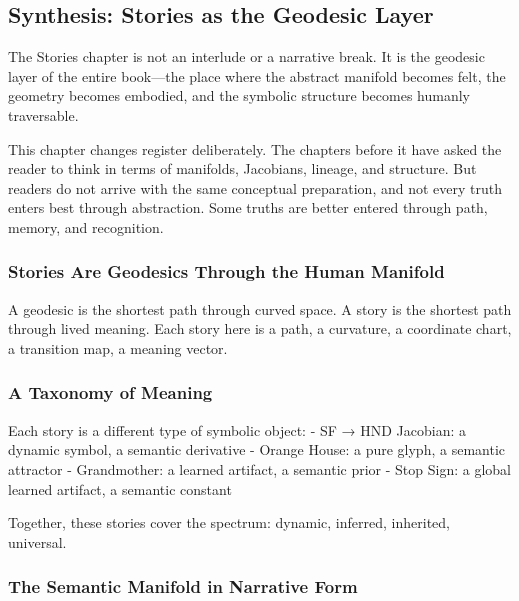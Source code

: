 \documentclass[
]{article}
\begin{document}
\hypertarget{synthesis-stories-as-the-geodesic-layer}{%
\subsection{Synthesis: Stories as the Geodesic
Layer}\label{synthesis-stories-as-the-geodesic-layer}}

The Stories chapter is not an interlude or a narrative break. It is the
geodesic layer of the entire book---the place where the abstract
manifold becomes felt, the geometry becomes embodied, and the symbolic
structure becomes humanly traversable.

This chapter changes register deliberately. The chapters before it have
asked the reader to think in terms of manifolds, Jacobians, lineage, and
structure. But readers do not arrive with the same conceptual
preparation, and not every truth enters best through abstraction. Some
truths are better entered through path, memory, and recognition.

\hypertarget{stories-are-geodesics-through-the-human-manifold}{%
\subsubsection{Stories Are Geodesics Through the Human
Manifold}\label{stories-are-geodesics-through-the-human-manifold}}

A geodesic is the shortest path through curved space. A story is the
shortest path through lived meaning. Each story here is a path, a
curvature, a coordinate chart, a transition map, a meaning vector.

\hypertarget{a-taxonomy-of-meaning}{%
\subsubsection{A Taxonomy of Meaning}\label{a-taxonomy-of-meaning}}

Each story is a different type of symbolic object: - SF → HND Jacobian:
a dynamic symbol, a semantic derivative - Orange House: a pure glyph, a
semantic attractor - Grandmother: a learned artifact, a semantic prior -
Stop Sign: a global learned artifact, a semantic constant

Together, these stories cover the spectrum: dynamic, inferred,
inherited, universal.

\hypertarget{the-semantic-manifold-in-narrative-form}{%
\subsubsection{The Semantic Manifold in Narrative
Form}\label{the-semantic-manifold-in-narrative-form}}
\end{document}
